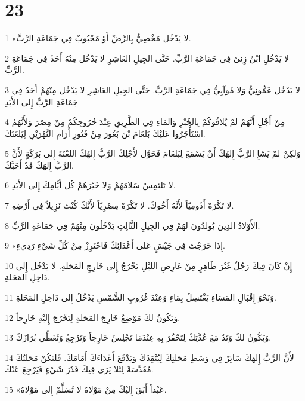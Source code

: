 \chapter{23}

\par 1 «لا يَدْخُل مَخْصِيٌّ بِالرَّضِّ أَوْ مَجْبُوبٌ فِي جَمَاعَةِ الرَّبِّ.
\par 2 لا يَدْخُلِ ابْنُ زِنىً فِي جَمَاعَةِ الرَّبِّ. حَتَّى الجِيلِ العَاشِرِ لا يَدْخُل مِنْهُ أَحَدٌ فِي جَمَاعَةِ الرَّبِّ.
\par 3 لا يَدْخُل عَمُّونِيٌّ وَلا مُوآبِيٌّ فِي جَمَاعَةِ الرَّبِّ. حَتَّى الجِيلِ العَاشِرِ لا يَدْخُل مِنْهُمْ أَحَدٌ فِي جَمَاعَةِ الرَّبِّ إِلى الأَبَدِ
\par 4 مِنْ أَجْلِ أَنَّهُمْ لمْ يُلاقُوكُمْ بِالخُبْزِ وَالمَاءِ فِي الطَّرِيقِ عِنْدَ خُرُوجِكُمْ مِنْ مِصْرَ وَلأَنَّهُمُ اسْتَأْجَرُوا عَليْكَ بَلعَامَ بْنَ بَعُورَ مِنْ فَتُورِ أَرَامِ النَّهْرَيْنِ لِيَلعَنَكَ.
\par 5 وَلكِنْ لمْ يَشَإِ الرَّبُّ إِلهُكَ أَنْ يَسْمَعَ لِبَلعَامَ فَحَوَّل لأَجْلِكَ الرَّبُّ إِلهُكَ اللعْنَةَ إِلى بَرَكَةٍ لأَنَّ الرَّبَّ إِلهَكَ قَدْ أَحَبَّكَ.
\par 6 لا تَلتَمِسْ سَلامَهُمْ وَلا خَيْرَهُمْ كُل أَيَّامِكَ إِلى الأَبَدِ.
\par 7 لا تَكْرَهْ أَدُومِيّاً لأَنَّهُ أَخُوكَ. لا تَكْرَهْ مِصْرِيّاً لأَنَّكَ كُنْتَ نَزِيلاً فِي أَرْضِهِ.
\par 8 الأَوْلادُ الذِينَ يُولدُونَ لهُمْ فِي الجِيلِ الثَّالِثِ يَدْخُلُونَ مِنْهُمْ فِي جَمَاعَةِ الرَّبِّ.
\par 9 «إِذَا خَرَجْتَ فِي جَيْشٍ عَلى أَعْدَائِكَ فَاحْتَرِزْ مِنْ كُلِّ شَيْءٍ رَدِيءٍ.
\par 10 إِنْ كَانَ فِيكَ رَجُلٌ غَيْرَ طَاهِرٍ مِنْ عَارِضِ الليْلِ يَخْرُجُ إِلى خَارِجِ المَحَلةِ. لا يَدْخُل إِلى دَاخِلِ المَحَلةِ.
\par 11 وَنَحْوَ إِقْبَالِ المَسَاءِ يَغْتَسِلُ بِمَاءٍ وَعِنْدَ غُرُوبِ الشَّمْسِ يَدْخُلُ إِلى دَاخِلِ المَحَلةِ.
\par 12 وَيَكُونُ لكَ مَوْضِعٌ خَارِجَ المَحَلةِ لِتَخْرُجَ إِليْهِ خَارِجاً.
\par 13 وَيَكُونُ لكَ وَتَدٌ مَعَ عُدَّتِكَ لِتَحْفُرَ بِهِ عِنْدَمَا تَجْلِسُ خَارِجاً وَتَرْجِعُ وَتُغَطِّي بُرَازَكَ.
\par 14 لأَنَّ الرَّبَّ إِلهَكَ سَائِرٌ فِي وَسَطِ مَحَلتِكَ لِيُنْقِذَكَ وَيَدْفَعَ أَعْدَاءَكَ أَمَامَكَ. فَلتَكُنْ مَحَلتُكَ مُقَدَّسَةً لِئَلا يَرَى فِيكَ قَذَرَ شَيْءٍ فَيَرْجِعَ عَنْكَ.
\par 15 «عَبْداً أَبَقَ إِليْكَ مِنْ مَوْلاهُ لا تُسَلِّمْ إِلى مَوْلاهُ.
